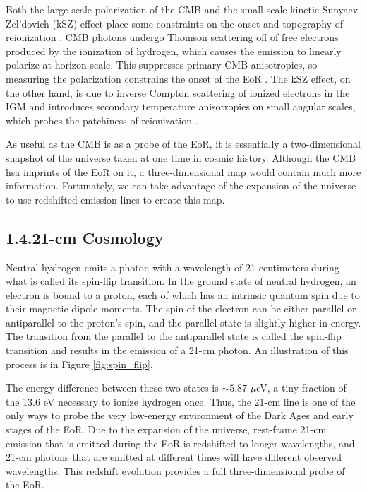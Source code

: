 \documentclass[12pt]{article}
\begin{document}
Both the large-scale polarization of the CMB and the small-scale kinetic Sunyaev-Zel'dovich (kSZ) effect place some constraints on the onset and topography of reionization \citep{fan2006}. CMB photons undergo Thomson scattering off of free electrons produced by the ionization of hydrogen, which causes the emission to linearly polarize at horizon scale. This suppresses primary CMB anisotropies, so measuring the polarization constrains the onset of the EoR \citep[e.g.,][]{zaldarriaga1997, roy2018}. The kSZ effect, on the other hand, is due to inverse Compton scattering of ionized electrons in the IGM and introduces secondary temperature anisotropies on small angular scales, which probes the patchiness of reionization \citep{fan2006, park2013, roy2018}.

As useful as the CMB is as a probe of the EoR, it is essentially a two-dimensional snapshot of the universe taken at one time in cosmic history. Although the CMB hsa imprints of the EoR on it, a three-dimensional map would contain much more information. Fortunately, we can take advantage of the expansion of the universe to use redshifted emission lines to create this map. \vspace{3mm}

\tocless\subsection{\hypertarget{subsec:21cm}{1.4.\hspace{0.75em}21-cm Cosmology}}

Neutral hydrogen emits a photon with a wavelength of 21 centimeters during what is called its spin-flip transition. In the ground state of neutral hydrogen, an electron is bound to a proton, each of which has an intrinsic quantum spin due to their magnetic dipole moments. The spin of the electron can be either parallel or antiparallel to the proton's spin, and the parallel state is slightly higher in energy. The transition from the parallel to the antiparallel state is called the spin-flip transition and results in the emission of a 21-cm photon. An illustration of this process is in Figure \ref{fig:spin_flip}.

The energy difference between these two states is $\sim 5.87$ $\mu$eV, a tiny fraction of the 13.6 eV necessary to ionize hydrogen once. Thus, the 21-cm line is one of the only ways to probe the very low-energy environment of the Dark Ages and early stages of the EoR. Due to the expansion of the universe, rest-frame 21-cm emission that is emitted during the EoR is redshifted to longer wavelengths, and 21-cm photons that are emitted at different times will have different observed wavelengths. This redshift evolution provides a full three-dimensional probe of the EoR.
\end{document}
